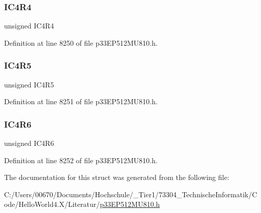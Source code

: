 \subsubsection{\texorpdfstring{I\+C4\+R4}{IC4R4}}
{\footnotesize\ttfamily unsigned I\+C4\+R4}



Definition at line 8250 of file p33\+E\+P512\+M\+U810.\+h.

\mbox{\label{structtag_r_p_i_n_r8_b_i_t_s_a0846b33667eb59bda2c8303553514c93}} 
\subsubsection{\texorpdfstring{I\+C4\+R5}{IC4R5}}
{\footnotesize\ttfamily unsigned I\+C4\+R5}



Definition at line 8251 of file p33\+E\+P512\+M\+U810.\+h.

\mbox{\label{structtag_r_p_i_n_r8_b_i_t_s_a45265718eaf320567aa4f8898deaf594}} 
\subsubsection{\texorpdfstring{I\+C4\+R6}{IC4R6}}
{\footnotesize\ttfamily unsigned I\+C4\+R6}



Definition at line 8252 of file p33\+E\+P512\+M\+U810.\+h.



The documentation for this struct was generated from the following file\+:\begin{DoxyCompactItemize}
\item 
C\+:/\+Users/00670/\+Documents/\+Hochschule/\+\_\+\+Tier1/73304\+\_\+\+Technische\+Informatik/\+Code/\+Hello\+World4.\+X/\+Literatur/\hyperlink{p33_e_p512_m_u810_8h}{p33\+E\+P512\+M\+U810.\+h}\end{DoxyCompactItemize}
